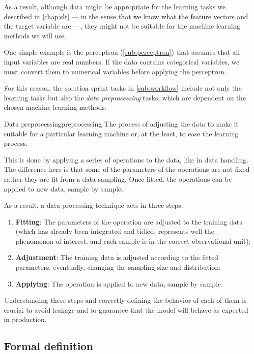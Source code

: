 As a result, although data might be appropriate for the learning tasks we described in
\cref{chap:slt} --- in the sense that we know what the feature vectors and the target
variable are ---, they might not be suitable for the machine learning methods we will use.

One simple example is the perceptron (\cref{sub:perceptron}) that assumes that all
input variables are real numbers.  If the data contains categorical variables, we must
convert them to numerical variables before applying the perceptron.

For this reason, the solution sprint tasks in \cref{sub:workflow} include not only the
learning tasks but also the \emph{data preprocessing} tasks, which are dependent on the
chosen machine learning methods.

\begin{defbox}{Data preprocessing}{preprocessing}
  The process of adjusting the data to make it suitable for a particular learning machine
  or, at the least, to ease the learning process.
\end{defbox}

This is done by applying a series of operations to the data, like in data handling.  The
difference here is that some of the parameters of the operations are not fixed rather they
are fit from a data sampling.  Once fitted, the operations can be applied to
new data, sample by sample.

As a result, a data processing technique acts in three steps:
\begin{enumerate}
  \itemsep0em
  \item \textbf{Fitting}: The parameters of the operation are adjusted to the training
    data (which has already been integrated and tidied, represents well the phenomenon of
    interest, and each sample is in the correct observational unit);
  \item \textbf{Adjustment}: The training data is adjusted according to the fitted
    parameters, eventually, changing the sampling size and distribution;
  \item \textbf{Applying}: The operation is applied to new data, sample by sample.
\end{enumerate}

Understanding these steps and correctly defining the behavior of each of them is crucial
to avoid \gls{leakage} and to guarantee that the model will behave as expected in
production.

\subsection{Formal definition}
\label{sub:formal-preprocessing}

